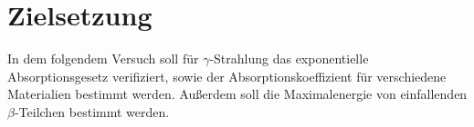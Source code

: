 \section{Zielsetzung}

\label{sec:Zielsetzung}
In dem folgendem Versuch soll für $\gamma$-Strahlung das exponentielle Absorptionsgesetz verifiziert, sowie der Absorptionskoeffizient
für verschiedene Materialien bestimmt werden. Außerdem soll die Maximalenergie von einfallenden $\beta$-Teilchen bestimmt werden.
